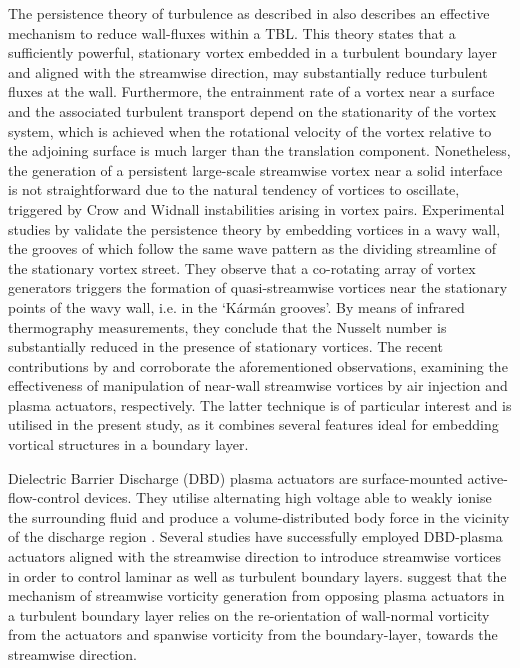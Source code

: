 The persistence theory of turbulence as described in \citet{Breidenthal1994persistence,Cotel1996stationary} also describes an effective mechanism to reduce wall-fluxes within a TBL. This theory states that a sufficiently powerful, stationary vortex embedded in a turbulent boundary layer and aligned with the streamwise direction, may substantially reduce turbulent fluxes at the wall. Furthermore, the entrainment rate of a vortex near a surface and the associated turbulent transport depend on the stationarity of the vortex system, which is achieved when the rotational velocity of the vortex relative to the adjoining surface is much larger than the translation component.
Nonetheless, the generation of a persistent large-scale streamwise vortex near a solid interface is not straightforward due to the natural tendency of vortices to oscillate, triggered by Crow \citep{Crow1970vortex} and Widnall \citep{widnall1974instability} instabilities arising in vortex pairs. Experimental studies by \citet{Balle2002persistence} validate the persistence theory by embedding vortices in a wavy wall, the grooves of which follow the same wave pattern as the dividing streamline of the stationary vortex street. They observe that a co-rotating array of vortex generators triggers the formation of quasi-streamwise vortices near the stationary points of the wavy wall, i.e. in the `K\'{a}rm\'{a}n grooves'. By means of infrared thermography measurements, they conclude that the Nusselt number is substantially reduced in the presence of stationary vortices. The recent contributions by \citet{Wittig2019VGplasma} and \citet{Weber2021VGair} corroborate the aforementioned observations, examining the effectiveness of manipulation of near-wall streamwise vortices by air injection and plasma actuators, respectively. The latter technique is of particular interest and is utilised in the present study, as it combines several features ideal for embedding vortical structures in a boundary layer.

Dielectric Barrier Discharge (DBD) plasma actuators are surface-mounted active-flow-control devices. They utilise alternating high voltage able to weakly ionise the surrounding fluid and produce a volume-distributed body force in the vicinity of the discharge region \citep{Moreau2007review, Corke2010review, wang2013recent, Benard2014review, Kotsonis2015review}. Several studies have successfully employed DBD-plasma actuators aligned with the streamwise direction to introduce streamwise vortices in order to control laminar \citep{jukes2013plasmaVG,serpieri2017,Dorr2018TSplasma} as well as turbulent \citep{Whalley2010DBDvortex} boundary layers. \citet{Wicks2015} suggest that the mechanism of streamwise vorticity generation from opposing plasma actuators in a turbulent boundary layer relies on the re-orientation of wall-normal vorticity from the actuators and spanwise vorticity from the boundary-layer, towards the streamwise direction.

